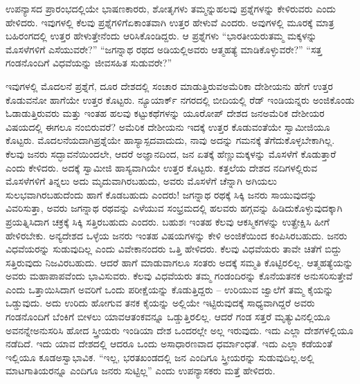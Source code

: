 ಉಪನ್ಯಾಸದ ಪ್ರಾರಂಭದಲ್ಲಿಯೇ ಭಾಷಣಕಾರರು, ಶೋತೃಗಳು ತಮ್ಮನ್ನು\break ಹಲವು ಪ್ರಶ್ನೆಗಳನ್ನು ಕೇಳಿರುವರು ಎಂದು ಹೇಳಿದರು. ಇವುಗಳಲ್ಲಿ ಕೆಲವು ಪ್ರಶ್ನೆಗಳಿಗೆ\break ಏಕಾಂತವಾಗಿ ಉತ್ತರ ಹೇಳುವೆ ಎಂದರು. ಅವುಗಳಲ್ಲಿ ಮೂರಕ್ಕೆ ಮಾತ್ರ ಬಹಿರಂಗದಲ್ಲಿ ಉತ್ತರ ಹೇಳುತ್ತೇನೆಂದು ಆರಿಸಿಕೊಂಡಿದ್ದರು. ಆ ಪ್ರಶ್ನೆಗಳು “ಭಾರತೀಯರು\break ತಮ್ಮ ಮಕ್ಕಳನ್ನು ಮೊಸಳೆಗಳಿಗೆ ಎಸೆಯುವರೇ?” “ಜಗನ್ನಾಥ ರಥದ ಅಡಿಯಲ್ಲಿ\break ಅವರು ಆತ್ಮಹತ್ಯೆ ಮಾಡಿಕೊಳ್ಳುವರೇ?” “ಸತ್ತ ಗಂಡನೊಂದಿಗೆ ವಿಧವೆಯನ್ನು ಜೀವಸಹಿತ ಸುಡುವರೇ?”

ಇವುಗಳಲ್ಲಿ ಮೊದಲನೆ ಪ್ರಶ್ನೆಗೆ, ದೂರ ದೇಶದಲ್ಲಿ ಸಂಚಾರ ಮಾಡುತ್ತಿರುವ\break ಅಮೆರಿಕಾ ದೇಶೀಯನು ಹೇಗೆ ಉತ್ತರ ಕೊಡುವನೋ ಹಾಗೆಯೇ ಉತ್ತರ ಕೊಟ್ಟರು. ನ್ಯೂಯಾರ್ಕ್​ ನಗರದಲ್ಲಿ ಬೀದಿಯಲ್ಲಿ ರೆಡ್​ ಇಂಡಿಯನ್ನರು ಅಂಜಿಕೊಂಡು ಓಡಾಡು\-ತ್ತಿರುವರು ಮತ್ತು ಇಂತಹ ಹಲವು ಕಟ್ಟುಕಥೆಗಳನ್ನು ಯೂರೋಪ್​ ದೇಶದ ಜನ\break ಅಮೆರಿಕ ದೇಶೀಯರ ವಿಷಯದಲ್ಲಿ ಈಗಲೂ ನಂಬಿರುವರೆ? ಅಮೆರಿಕ ದೇಶೀಯನು ಇದಕ್ಕೆ ಉತ್ತರ ಕೊಡುವಂತೆಯೇ ಸ್ವಾಮೀಜಿಯೂ ಕೊಟ್ಟರು. ಮೊದಲನೆಯದಾಗಿ\break ಪ್ರಶ್ನೆಯೇ ಹಾಸ್ಯಾಸ್ಪದವಾದುದು, ನಾವು ಅದನ್ನು ಗಮನಕ್ಕೆ ತೆಗೆದುಕೊಳ್ಳಬೇಕಾಗಿಲ್ಲ. ಕೆಲವು ಜನರು ಸದ್ಭಾವನೆಯಿಂದಲೇ, ಆದರೆ ಅಜ್ಞಾನದಿಂದ, ಜನ ಏತಕ್ಕೆ ಹೆಣ್ಣುಮಕ್ಕಳನ್ನು ಮೊಸಳೆಗೆ ಕೊಡುತ್ತಾರೆ ಎಂದು ಕೇಳಿದರು. ಅದಕ್ಕೆ ಸ್ವಾಮೀಜಿ ಹಾಸ್ಯವಾಗಿಯೇ ಉತ್ತರ ಕೊಟ್ಟರು. ಕತ್ತಲೆಯ ದೇಶದ ನದಿಗಳಲ್ಲಿರುವ ಮೊಸಳೆಗಳಿಗೆ ತಿನ್ನಲು ಅದು ಮೃದುವಾಗಿರಬಹುದು, ಅವರು ಮೊಸಳೆಗೆ ಚೆನ್ನಾಗಿ ಅಗಿಯಲು ಸುಲಭವಾಗಿರಬಹುದೆಂದು ಹಾಗೆ ಕೊಡಬಹುದು ಎಂದರು! ಜಗನ್ನಾಥ ರಥಕ್ಕೆ ಸಿಕ್ಕಿ ಜನರು ಸಾಯುವುದನ್ನು ವಿವರಿಸುತ್ತಾ, ಅವರು ಜಗನ್ನಾಥ ರಥವನ್ನು ಎಳೆಯುವ ಸಂಭ್ರಮದಲ್ಲಿ ಹಲವರು ಹಗ್ಗವನ್ನು ಹಿಡಿದುಕೊಳ್ಳುವುದಕ್ಕಾಗಿ ಪ್ರಯತ್ನಿಸಿದಾಗ ಚಕ್ರಕ್ಕೆ ಸಿಕ್ಕಿ ಸತ್ತಿರಬಹುದು ಎಂದರು. ಬಹುಶಃ ಇಂತಹ ಕೆಲವು ಆಕಸ್ಮಿಕಗಳನ್ನು ಉತ್ಪ್ರೇಕ್ಷಿಸಿ ಹೀಗೆ ಹೇಳಿರಬೇಕು. ಅನ್ಯದೇಶದ ಒಳ್ಳೆಯ ಜನರು ಇಂತಹ ವಿಷಯಗಳನ್ನು ಕೇಳಿ ಅಂಜಿಕೆಯಿಂದ ಕಂಪಿಸಿರಬಹುದು. ಜನರು ವಿಧವೆಯರನ್ನು ಸುಡುವುದಿಲ್ಲ ಎಂದು ವಿವೇಕಾನಂದರು ಒತ್ತಿ ಹೇಳಿದರು. ಕೆಲವು ವಿಧವೆಯರು ತಾವೇ ಚಿತೆಗೆ ಬಿದ್ದು ಸತ್ತಿರುವುದು ನಿಜವಿರಬಹುದು. ಆದರೆ ಹಾಗೆ ಮಾಡುವಾಗಲೂ ಸಂತರು ಅದಕ್ಕೆ ಸಮ್ಮತಿ ಕೊಟ್ಟಿರಲಿಲ್ಲ. ಆತ್ಮಹತ್ಯೆಯನ್ನು ಅವರು ಮಹಾಪಾಪವೆಂದು ಭಾವಿಸುವರು. ಕೆಲವು ವಿಧವೆಯರು ತಮ್ಮ ಗಂಡಂದಿರನ್ನು ಕೊನೆಯತನಕ ಅನುಸರಿಸುತ್ತೇವೆ ಎಂದು ಒತ್ತಾಯಿಸಿದಾಗ ಅವರಿಗೆ ಒಂದು ಪರೀಕ್ಷೆಯನ್ನು ಕೊಡುತ್ತಿದ್ದರು – ಉರಿಯುವ ಜ್ವಾಲೆಗೆ ತಮ್ಮ ಕೈಯನ್ನು ಒಡ್ಡುವುದು. ಅದು ಉರಿದು ಹೋಗುವ ತನಕ ಕೈಯನ್ನು ಅಲ್ಲಿಯೇ ಇಟ್ಟಿರುವುದಕ್ಕೆ ಸಾಧ್ಯವಾಗಿದ್ದರೆ ಅವರು ಗಂಡನೊಂದಿಗೆ ಬೆಂಕಿಗೆ ಬೀಳಲು ಯಾವ\break ಆತಂಕವನ್ನೂ ಒಡ್ಡುತ್ತಿರಲಿಲ್ಲ. ಆದರೆ ಗಂಡ ಸತ್ತರೆ ಮೃತ್ಯುವಿನಲ್ಲಿಯೂ ಅವನನ್ನೇ\break ಅನುಸರಿಸಿ ಹೋದ ಸ್ತ್ರೀಯರು ಇಂಡಿಯಾ ದೇಶ ಒಂದರಲ್ಲೇ ಅಲ್ಲ ಇರುವುದು. ಇದು ಎಲ್ಲಾ ದೇಶಗಳಲ್ಲಿಯೂ ನಡೆದಿದೆ. ಇದು ಯಾವ ದೇಶದಲ್ಲಿ ಆದರೂ ಒಂದು ಅಸಾಧಾರಣವಾದ ಧರ್ಮಾಂಧತೆ. ಇದು ಎಲ್ಲಾ ಕಡೆಯಂತೆ ಇಲ್ಲಿಯೂ ಕೂಡ\break ಅಸ್ವಾಭಾವಿಕ. “ಇಲ್ಲ, ಭರತಖಂಡದಲ್ಲಿ ಜನ ಎಂದಿಗೂ ಸ್ತ್ರೀಯರನ್ನು ಸುಡುವುದಿಲ್ಲ.\break ಅಲ್ಲಿ ಮಾಟಗಾತಿಯರನ್ನೂ ಎಂದಿಗೂ ಜನರು ಸುಟ್ಟಿಲ್ಲ” ಎಂದು ಉಪನ್ಯಾಸಕರು ಮತ್ತೆ ಹೇಳಿದರು.

